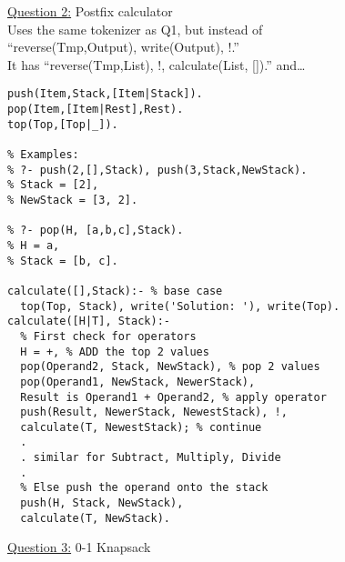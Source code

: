 \documentclass[8pt,letterpaper,twocolumn]{article}
\begin{document}
\underline{Question 2:} Postfix calculator\\
Uses the same tokenizer as Q1, but instead of\\
``reverse(Tmp,Output), write(Output), !.''\\
It has ``reverse(Tmp,List), !, calculate(List, []).'' and\ldots
\begin{verbatim}
push(Item,Stack,[Item|Stack]).
pop(Item,[Item|Rest],Rest).
top(Top,[Top|_]).

% Examples:
% ?- push(2,[],Stack), push(3,Stack,NewStack).
% Stack = [2],
% NewStack = [3, 2].

% ?- pop(H, [a,b,c],Stack).
% H = a,
% Stack = [b, c].

calculate([],Stack):- % base case
  top(Top, Stack), write('Solution: '), write(Top).
calculate([H|T], Stack):-
  % First check for operators
  H = +, % ADD the top 2 values
  pop(Operand2, Stack, NewStack), % pop 2 values
  pop(Operand1, NewStack, NewerStack),
  Result is Operand1 + Operand2, % apply operator
  push(Result, NewerStack, NewestStack), !,
  calculate(T, NewestStack); % continue
  .
  . similar for Subtract, Multiply, Divide
  .
  % Else push the operand onto the stack
  push(H, Stack, NewStack),
  calculate(T, NewStack).
\end{verbatim}
\underline{Question 3:} 0-1 Knapsack
\end{document}
